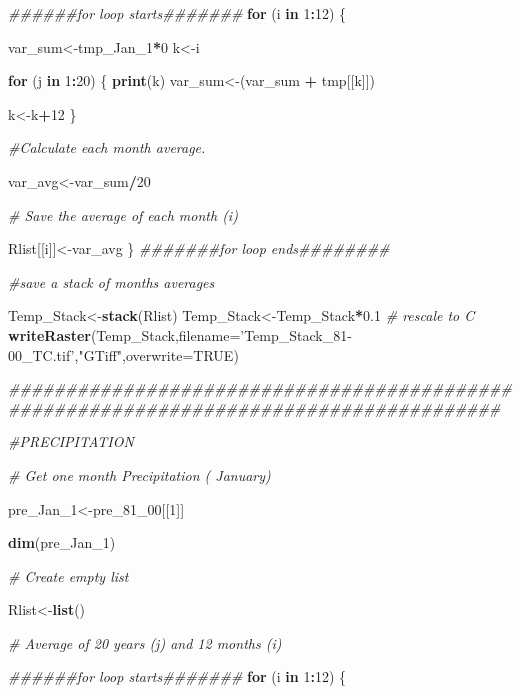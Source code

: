 \documentclass[
  10pt,
  b5paper,
]{book}
\newenvironment{Shaded}{\begin{snugshade}}{\end{snugshade}}
\newcommand{\CommentTok}[1]{\textcolor[rgb]{0.56,0.35,0.01}{\textit{#1}}}
\newcommand{\ControlFlowTok}[1]{\textcolor[rgb]{0.13,0.29,0.53}{\textbf{#1}}}
\newcommand{\DataTypeTok}[1]{\textcolor[rgb]{0.13,0.29,0.53}{#1}}
\newcommand{\DecValTok}[1]{\textcolor[rgb]{0.00,0.00,0.81}{#1}}
\newcommand{\FloatTok}[1]{\textcolor[rgb]{0.00,0.00,0.81}{#1}}
\newcommand{\KeywordTok}[1]{\textcolor[rgb]{0.13,0.29,0.53}{\textbf{#1}}}
\newcommand{\NormalTok}[1]{#1}
\newcommand{\OperatorTok}[1]{\textcolor[rgb]{0.81,0.36,0.00}{\textbf{#1}}}
\newcommand{\OtherTok}[1]{\textcolor[rgb]{0.56,0.35,0.01}{#1}}
\newcommand{\StringTok}[1]{\textcolor[rgb]{0.31,0.60,0.02}{#1}}
\begin{document}
\begin{Shaded}
\begin{Highlighting}[]
\CommentTok{######for loop starts#######}
\ControlFlowTok{for}\NormalTok{ (i }\ControlFlowTok{in} \DecValTok{1}\OperatorTok{:}\DecValTok{12}\NormalTok{) \{ }

\NormalTok{var_sum<-tmp_Jan_}\DecValTok{1}\OperatorTok{*}\DecValTok{0}
\NormalTok{k<-i}

\ControlFlowTok{for}\NormalTok{ (j }\ControlFlowTok{in} \DecValTok{1}\OperatorTok{:}\DecValTok{20}\NormalTok{) \{}
\KeywordTok{print}\NormalTok{(k)}
\NormalTok{var_sum<-(var_sum }\OperatorTok{+}\StringTok{ }\NormalTok{tmp[[k]])}

\NormalTok{k<-k}\OperatorTok{+}\DecValTok{12}
\NormalTok{\}}

\CommentTok{#Calculate each month average. }

\NormalTok{var_avg<-var_sum}\OperatorTok{/}\DecValTok{20}

\CommentTok{# Save the average of each month (i)}

\NormalTok{Rlist[[i]]<-var_avg}
\NormalTok{\}}
\CommentTok{#######for loop ends########}

\CommentTok{#save a stack of months averages}

\NormalTok{Temp_Stack<-}\KeywordTok{stack}\NormalTok{(Rlist)}
\NormalTok{Temp_Stack<-Temp_Stack}\OperatorTok{*}\FloatTok{0.1} \CommentTok{# rescale to C}
\KeywordTok{writeRaster}\NormalTok{(Temp_Stack,}\DataTypeTok{filename=}\StringTok{'Temp_Stack_81-00_TC.tif'}\NormalTok{,}\StringTok{"GTiff"}\NormalTok{,}\DataTypeTok{overwrite=}\OtherTok{TRUE}\NormalTok{)}

\CommentTok{#######################################################################################}

\CommentTok{#PRECIPITATION}

\CommentTok{# Get one month Precipitation ( January)}

\NormalTok{pre_Jan_}\DecValTok{1}\NormalTok{<-pre_}\DecValTok{81}\NormalTok{_}\DecValTok{00}\NormalTok{[[}\DecValTok{1}\NormalTok{]]}

\KeywordTok{dim}\NormalTok{(pre_Jan_}\DecValTok{1}\NormalTok{)}

\CommentTok{# Create empty list}

\NormalTok{Rlist<-}\KeywordTok{list}\NormalTok{()}

\CommentTok{# Average of 20 years (j)  and 12 months (i) }

\CommentTok{######for loop starts#######}
\ControlFlowTok{for}\NormalTok{ (i }\ControlFlowTok{in} \DecValTok{1}\OperatorTok{:}\DecValTok{12}\NormalTok{) \{ }


\end{Highlighting}
\end{Shaded}
\end{document}
